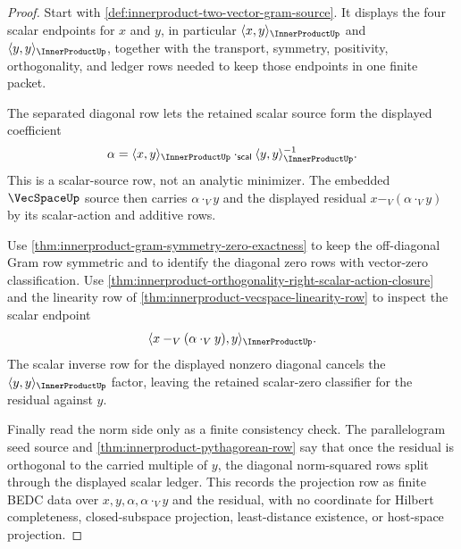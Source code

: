 \begin{proof}
Start with \autoref{def:innerproduct-two-vector-gram-source}. It displays the
four scalar endpoints for $x$ and $y$, in particular
$\langle x,y\rangle_{\InnerProductUp}$ and
$\langle y,y\rangle_{\InnerProductUp}$, together with the transport, symmetry,
positivity, orthogonality, and ledger rows needed to keep those endpoints in
one finite packet.

The separated diagonal row lets the retained scalar source form the displayed
coefficient
$$
\alpha=
\langle x,y\rangle_{\InnerProductUp}
\cdot_{\mathsf{scal}}
\langle y,y\rangle_{\InnerProductUp}^{-1}.
$$
This is a scalar-source row, not an analytic minimizer. The embedded
$\VecSpaceUp$ source then carries $\alpha\cdot_V y$ and the displayed residual
$x-_V(\alpha\cdot_V y)$ by its scalar-action and additive rows.

Use \autoref{thm:innerproduct-gram-symmetry-zero-exactness} to keep the
off-diagonal Gram row symmetric and to identify the diagonal zero rows with
vector-zero classification. Use
\autoref{thm:innerproduct-orthogonality-right-scalar-action-closure} and the
linearity row of \autoref{thm:innerproduct-vecspace-linearity-row} to inspect
the scalar endpoint
$$
\langle x-_V(\alpha\cdot_V y),y\rangle_{\InnerProductUp}.
$$
The scalar inverse row for the displayed nonzero diagonal cancels the
$\langle y,y\rangle_{\InnerProductUp}$ factor, leaving the retained
scalar-zero classifier for the residual against $y$.

Finally read the norm side only as a finite consistency check. The
parallelogram seed source and \autoref{thm:innerproduct-pythagorean-row} say
that once the residual is orthogonal to the carried multiple of $y$, the
diagonal norm-squared rows split through the displayed scalar ledger. This
records the projection row as finite BEDC data over $x,y,\alpha,\alpha\cdot_V
y$ and the residual, with no coordinate for Hilbert completeness,
closed-subspace projection, least-distance existence, or host-space
projection.
\end{proof}
